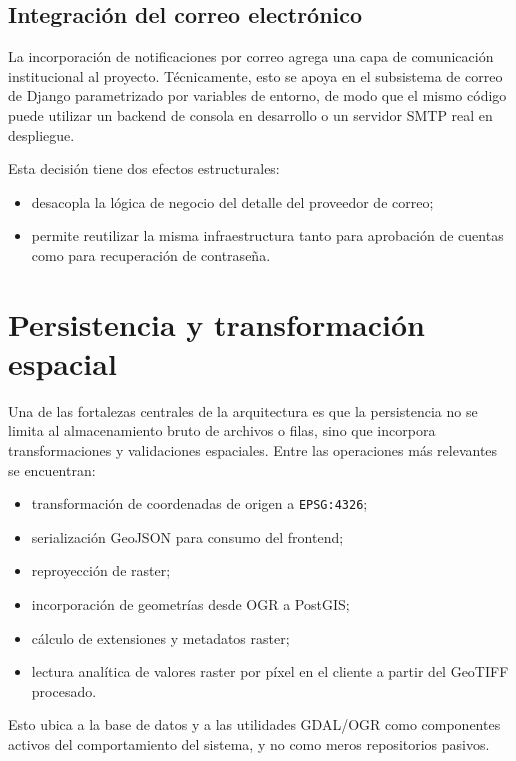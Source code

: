\documentclass[12pt,a4paper]{report}
\begin{document}
\subsection{Integraci\'on del correo electr\'onico}

La incorporaci\'on de notificaciones por correo agrega una capa de comunicaci\'on institucional al proyecto. T\'ecnicamente, esto se apoya en el subsistema de correo de Django parametrizado por variables de entorno, de modo que el mismo c\'odigo puede utilizar un backend de consola en desarrollo o un servidor SMTP real en despliegue.

Esta decisi\'on tiene dos efectos estructurales:

\begin{itemize}
    \item desacopla la l\'ogica de negocio del detalle del proveedor de correo;
    \item permite reutilizar la misma infraestructura tanto para aprobaci\'on de cuentas como para recuperaci\'on de contrase\~na.
\end{itemize}

\section{Persistencia y transformaci\'on espacial}

Una de las fortalezas centrales de la arquitectura es que la persistencia no se limita al almacenamiento bruto de archivos o filas, sino que incorpora transformaciones y validaciones espaciales. Entre las operaciones m\'as relevantes se encuentran:

\begin{itemize}
    \item transformaci\'on de coordenadas de origen a \texttt{EPSG:4326};
    \item serializaci\'on GeoJSON para consumo del frontend;
    \item reproyecci\'on de raster;
    \item incorporaci\'on de geometr\'ias desde OGR a PostGIS;
    \item c\'alculo de extensiones y metadatos raster;
    \item lectura anal\'itica de valores raster por p\'ixel en el cliente a partir del GeoTIFF procesado.
\end{itemize}

Esto ubica a la base de datos y a las utilidades GDAL/OGR como componentes activos del comportamiento del sistema, y no como meros repositorios pasivos.
\end{document}
